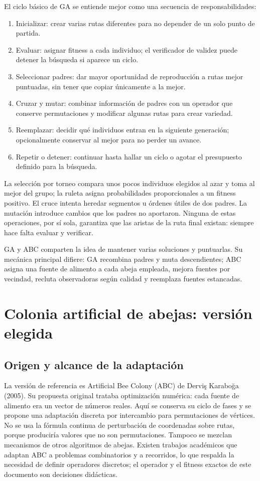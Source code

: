El ciclo básico de GA se entiende mejor como una secuencia de responsabilidades:
\begin{enumerate}[leftmargin=*]
\item Inicializar: crear varias rutas diferentes para no depender de un solo punto de partida.
\item Evaluar: asignar fitness a cada individuo; el verificador de validez puede detener la búsqueda si aparece un ciclo.
\item Seleccionar padres: dar mayor oportunidad de reproducción a rutas mejor puntuadas, sin tener que copiar únicamente a la mejor.
\item Cruzar y mutar: combinar información de padres con un operador que conserve permutaciones y modificar algunas rutas para crear variedad.
\item Reemplazar: decidir qué individuos entran en la siguiente generación; opcionalmente conservar al mejor para no perder un avance.
\item Repetir o detener: continuar hasta hallar un ciclo o agotar el presupuesto definido para la búsqueda.
\end{enumerate}

La selección por torneo compara unos pocos individuos elegidos al azar y toma al mejor del grupo; la ruleta asigna probabilidades proporcionales a un fitness positivo. El cruce intenta heredar segmentos u órdenes útiles de dos padres. La mutación introduce cambios que los padres no aportaron. Ninguna de estas operaciones, por sí sola, garantiza que las aristas de la ruta final existan: siempre hace falta evaluar y verificar.\cite{abc4,abc5,abc6}

GA y ABC comparten la idea de mantener varias soluciones y puntuarlas. Su mecánica principal difiere: GA recombina padres y muta descendientes; ABC asigna una fuente de alimento a cada abeja empleada, mejora fuentes por vecindad, recluta observadoras según calidad y reemplaza fuentes estancadas.\cite{abc4,abc5,abc7}

\section{Colonia artificial de abejas: versión elegida}
\subsection{Origen y alcance de la adaptación}
La versión de referencia es Artificial Bee Colony (ABC) de Derviş Karaboğa (2005). Su propuesta original trataba optimización numérica: cada fuente de alimento era un vector de números reales. Aquí se conserva su ciclo de fases y se propone una adaptación discreta por intercambio para permutaciones de vértices. No se usa la fórmula continua de perturbación de coordenadas sobre rutas, porque produciría valores que no son permutaciones. Tampoco se mezclan mecanismos de otros algoritmos de abejas. Existen trabajos académicos que adaptan ABC a problemas combinatorios y a recorridos, lo que respalda la necesidad de definir operadores discretos; el operador y el fitness exactos de este documento son decisiones didácticas.\cite{abc7,abc8,abc9}

